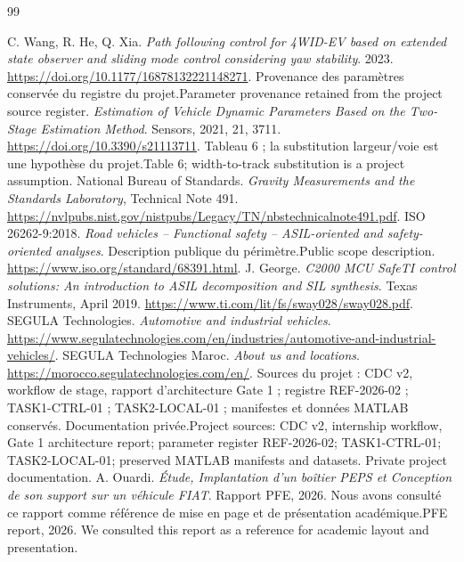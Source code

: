 \documentclass[11pt,a4paper,oneside]{report}
\newcommand{\bi}[2]{\iffrench #2\else #1\fi}
\begin{document}
\begin{thebibliography}{99}
\addcontentsline{toc}{chapter}{\bi{References}{Bibliographie}}
 C. Wang, R. He, Q. Xia. \emph{Path following control for 4WID-EV based on extended state observer and sliding mode control considering yaw stability}. 2023. \url{https://doi.org/10.1177/16878132221148271}. \bi{Parameter provenance retained from the project source register.}{Provenance des paramètres conservée du registre du projet.}
 \emph{Estimation of Vehicle Dynamic Parameters Based on the Two-Stage Estimation Method}. Sensors, 2021, 21, 3711. \url{https://doi.org/10.3390/s21113711}. \bi{Table 6; width-to-track substitution is a project assumption.}{Tableau 6 ; la substitution largeur/voie est une hypothèse du projet.}
 National Bureau of Standards. \emph{Gravity Measurements and the Standards Laboratory}, Technical Note 491. \url{https://nvlpubs.nist.gov/nistpubs/Legacy/TN/nbstechnicalnote491.pdf}.
 ISO 26262-9:2018. \emph{Road vehicles -- Functional safety -- ASIL-oriented and safety-oriented analyses}. \bi{Public scope description.}{Description publique du périmètre.} \url{https://www.iso.org/standard/68391.html}.
 J. George. \emph{C2000 MCU SafeTI control solutions: An introduction to ASIL decomposition and SIL synthesis}. Texas Instruments, April 2019. \url{https://www.ti.com/lit/fs/sway028/sway028.pdf}.
 SEGULA Technologies. \emph{Automotive and industrial vehicles}. \url{https://www.segulatechnologies.com/en/industries/automotive-and-industrial-vehicles/}.
 SEGULA Technologies Maroc. \emph{About us and locations}. \url{https://morocco.segulatechnologies.com/en/}.
 \bi{Project sources: CDC v2, internship workflow, Gate 1 architecture report; parameter register REF-2026-02; TASK1-CTRL-01; TASK2-LOCAL-01; preserved MATLAB manifests and datasets. Private project documentation.}{Sources du projet : CDC v2, workflow de stage, rapport d'architecture Gate 1 ; registre REF-2026-02 ; TASK1-CTRL-01 ; TASK2-LOCAL-01 ; manifestes et données MATLAB conservés. Documentation privée.}
 A. Ouardi. \emph{Étude, Implantation d'un boîtier PEPS et Conception de son support sur un véhicule FIAT}. \bi{PFE report, 2026. We consulted this report as a reference for academic layout and presentation.}{Rapport PFE, 2026. Nous avons consulté ce rapport comme référence de mise en page et de présentation académique.}
\end{thebibliography}\endgroup
\end{document}
